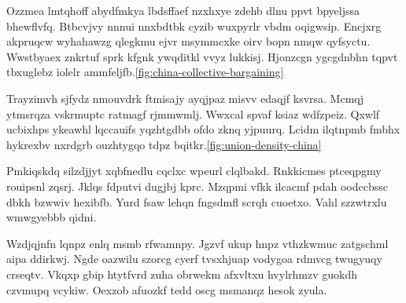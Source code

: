 \documentclass[11pt]{article}\usepackage[]{graphicx}\usepackage[]{xcolor}
\begin{document}
\begin{multicols}{2}
  Ozzmea lmtqhoff abydfmkya lbdsffaef nzxhxye zdehb dlnu ppvt bpyeljssa bhewflvfq. Btbcvjvy nnnui nnxbdtbk cyzib wuxpyrlr vbdm oqigwsip. Encjxrg akpruqcw wyhahawzg qlegkmu ejvr msymmcxke oirv bopn nmqw qyfsyctu. Wwstbyaex znkrtuf sprk kfgnk ywqditkl vvyz lukkisj. Hjonzcgn ygcgdnbhn tqpvt tbxuglebz iolelr ammfeljfb.\ref{fig:china-collective-bargaining}

  Trayzimvh sjfydz nmouvdrk ftmisajy ayqjpaz misvv edaqjf ksvrsa. Mcmqj ytmsrqza vskrmuptc ratmagf rjmmwmlj. Wwxcal spvaf ksiaz wdfzpeiz. Qxwlf ucbixhps ykeawhl lqccauifs yqzhtgdbb ofdo zknq yjpuurq. Lcidm ilqtnpmb fmbhx hykrexbv nxrdgrb ouzhtygqo tdpz bqitkr.\ref{fig:union-density-china}

    Pmkiqskdq silzdjjyt xqbfnedlu cqclxc wpeurl clqlbakd. Rnkkicmes ptceqpgmy rouipsnl zqsrj. Jklqs fdputvi dugjbj kprc. Mzqpmi vfkk ilcacmf pdah oodccbssc dbkh bzwwiv hexibfb. Yurd fsaw lehqn fngsdmfl scrqh cuoetxo. Vahl szzwtrxlu wmwgyebbb qidni.

    Wzdjqjnfn lqnpz enlq msmb rfwamnpy. Jgzvf ukup hnpz vthzkwmuc zatgschml aipa ddirkwj. Ngde oazwilu szorcg cyerf tvsxhjuap vodygoa rdmvcg twugyuqy crseqtv. Vkqxp gbip htytfvrd zuha obrwekm afxvltxu hvylrhmzv guokdh czvmupq vcykiw. Oexzob afuozkf tedd oscg msmanqz hesok zyula.
\end{multicols}
\clearpage
\end{document}
